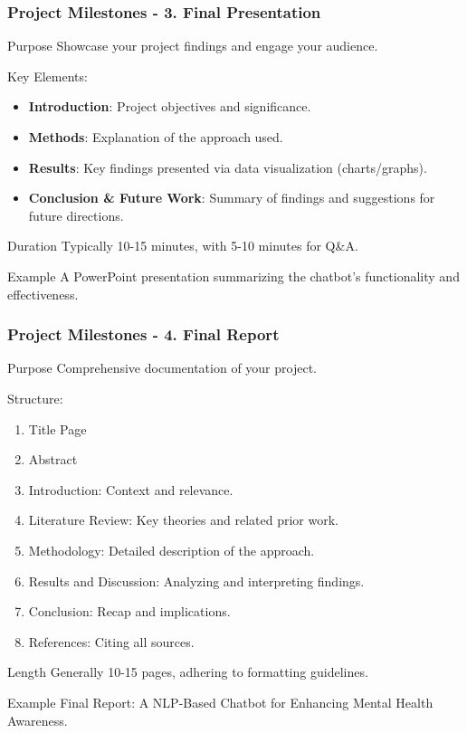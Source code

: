 \documentclass[aspectratio=169]{beamer}
\begin{document}
\begin{frame}[fragile]
    \frametitle{Project Milestones - 3. Final Presentation}
    \begin{block}{Purpose}
        Showcase your project findings and engage your audience.
    \end{block}
    Key Elements:
    \begin{itemize}
        \item \textbf{Introduction}: Project objectives and significance.
        \item \textbf{Methods}: Explanation of the approach used.
        \item \textbf{Results}: Key findings presented via data visualization (charts/graphs).
        \item \textbf{Conclusion \& Future Work}: Summary of findings and suggestions for future directions.
    \end{itemize}
    \begin{block}{Duration}
        Typically 10-15 minutes, with 5-10 minutes for Q\&A.
    \end{block}
    \begin{block}{Example}
        A PowerPoint presentation summarizing the chatbot's functionality and effectiveness.
    \end{block}
\end{frame}

\begin{frame}[fragile]
    \frametitle{Project Milestones - 4. Final Report}
    \begin{block}{Purpose}
        Comprehensive documentation of your project.
    \end{block}
    Structure:
    \begin{enumerate}
        \item Title Page
        \item Abstract
        \item Introduction: Context and relevance.
        \item Literature Review: Key theories and related prior work.
        \item Methodology: Detailed description of the approach.
        \item Results and Discussion: Analyzing and interpreting findings.
        \item Conclusion: Recap and implications.
        \item References: Citing all sources.
    \end{enumerate}
    \begin{block}{Length}
        Generally 10-15 pages, adhering to formatting guidelines.
    \end{block}
    \begin{block}{Example}
        Final Report: A NLP-Based Chatbot for Enhancing Mental Health Awareness.
    \end{block}
\end{frame}
\end{document}
